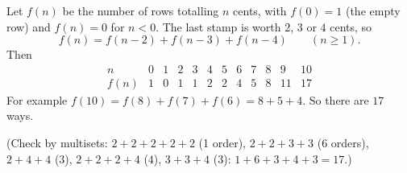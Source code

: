 Let $f(n)$ be the number of rows totalling $n$ cents, with $f(0)=1$ (the empty row) and $f(n)=0$ for $n<0$. The last stamp is worth $2$, $3$ or $4$ cents, so
\[
f(n)=f(n-2)+f(n-3)+f(n-4)\qquad(n\ge1).
\]
Then
\[
\begin{array}{c|ccccccccccc}
n&0&1&2&3&4&5&6&7&8&9&10\\\hline
f(n)&1&0&1&1&2&2&4&5&8&11&17
\end{array}
\]
For example $f(10)=f(8)+f(7)+f(6)=8+5+4$. So there are $\boxed{17}$ ways.

(Check by multisets: $2+2+2+2+2$ (1 order), $2+2+3+3$ ($6$ orders), $2+4+4$ ($3$), $2+2+2+4$ ($4$), $3+3+4$ ($3$): $1+6+3+4+3=17$.)
